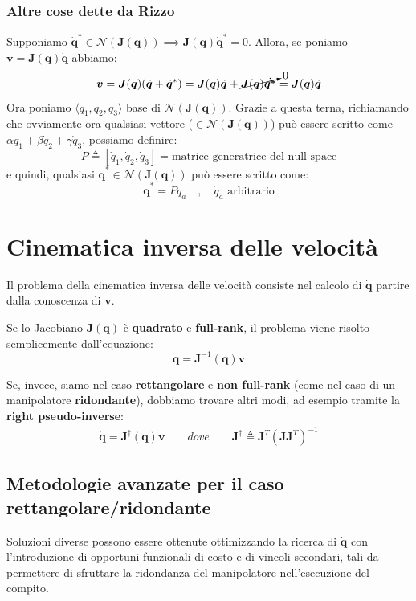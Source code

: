 \vspace*{5pt}
\subsubsection{Altre cose dette da Rizzo}

Supponiamo $\dot{\bm{q}}^* \in \mathcal{N}(\bm{J}(\bm{q})) \implies \bm{J}(\bm{q})\dot{\bm{q}}^* = 0$. Allora, se poniamo $\bm{v} = \bm{J}(\bm{q})\dot{\bm{q}}$ abbiamo:
$$
\bm{v} = \bm{J}(\bm{q})(\dot{\bm{q}} + \dot{\bm{q}}^*) = \bm{J}(\bm{q})\dot{\bm{q}} + \cancelto{0}{\bm{J}(\bm{q})\dot{\bm{q^*}}} = \bm{J}(\bm{q})\dot{\bm{q}}
$$
Ora poniamo $\langle\dot{q}_1, \dot{q}_2, \dot{q}_3\rangle$ base di $\mathcal{N}(\bm{J}(\bm{q}))$. Grazie a questa terna, richiamando che ovviamente ora qualsiasi vettore ($\in \mathcal{N}(\bm{J}(\bm{q}))$) può essere scritto come $\alpha\dot{q}_1 + \beta\dot{q}_2 + \gamma\dot{q}_3$, possiamo definire:
$$
P \triangleq [ \dot{q}_1, \dot{q}_2, \dot{q}_3 ]
=
\text{matrice generatrice del null space}
$$
e quindi, qualsiasi $\dot{\bm{q}}^* \in \mathcal{N}(\bm{J}(\bm{q}))$ può essere scritto come:
$$
\dot{\bm{q}}^* = P\dot{q}_a \quad , \quad \dot{q}_a \text{ arbitrario}
$$






\section{Cinematica inversa delle velocità}
Il problema della cinematica inversa delle velocità consiste nel calcolo di $\dot{\bm{q}}$ partire dalla conoscenza di $\bm{v}$.

Se lo Jacobiano $\bm{J}(\bm{q})$ è \textbf{quadrato} e \textbf{full-rank}, il problema viene risolto semplicemente dall’equazione:
\begin{equation}\label{eq:diff_inv_kine}
\dot{\bm{q}} = \bm{J}^{-1}(\bm{q})\bm{v}
\end{equation}

Se, invece, siamo nel caso \textbf{rettangolare} e \textbf{non full-rank} (come nel caso di un manipolatore \textbf{ridondante}), dobbiamo trovare altri modi, ad esempio tramite la \textbf{right pseudo-inverse}:
\begin{align}\label{eq:diff_inv_kine_pseudo}
\dot{\bm{q}} = \bm{J}^{\dagger}(\bm{q})\bm{v}
\qquad
\textit{dove}
\qquad
\bm{J}^{\dagger} \triangleq \bm{J}^{T}(\bm{J} \bm{J}^{T})^{-1}
\end{align}


\subsection{Metodologie avanzate per il caso rettangolare/ridondante}
Soluzioni diverse possono essere ottenute ottimizzando la ricerca di $\dot{\bm{q}}$ con l’introduzione di opportuni funzionali di costo e di vincoli secondari, tali da permettere di sfruttare la ridondanza del manipolatore nell’esecuzione del compito.

